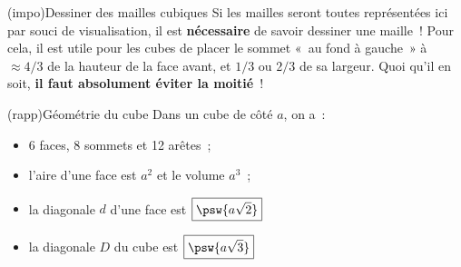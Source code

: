 \documentclass[../../main/main.tex]{subfiles}
\begin{document}
\begin{tcb*}(impo){Dessiner des mailles cubiques}
	Si les mailles seront toutes représentées ici par souci de visualisation, il
	est \textbf{nécessaire} de savoir dessiner une maille~! Pour cela, il est
	utile pour les cubes de placer le sommet «~au fond à gauche~» à $\approx 4/3$
	de la hauteur de la face avant, et $1/3$ ou $2/3$ de sa largeur. Quoi qu'il en
	soit, \textbf{il faut absolument éviter la moitié}~!
\end{tcb*}

\begin{tcb*}[sidebyside, righthand ratio=.3](rapp){Géométrie du cube}
	Dans un cube de côté $a$, on a~:
	\begin{itemize}
		\item 6 faces, 8 sommets et 12 arêtes~;
		\item l'aire d'une face est $a^2$ et le volume $a^3$~;
		      \setlength{\fboxsep}{3mm}
		\item la diagonale $d$ d'une face est $\boxed{\psw{a \sqrt{2}}}$
		\item la diagonale $D$ du cube est $\boxed{\psw{a \sqrt{3}}}$
	\end{itemize}
	\tcblower
	\begin{center}
\end{center}
\end{tcb*}
\end{document}
